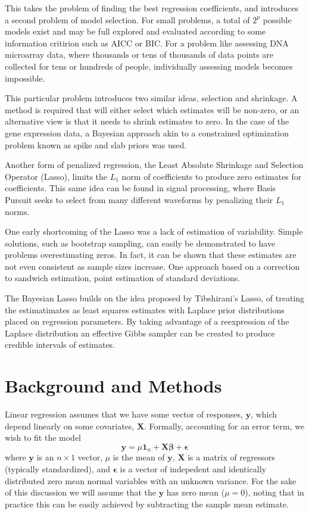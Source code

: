 \documentclass{uwstat572}
\begin{document}
This takes the problem of finding the best regression coefficients, and introduces a second problem of model selection. For small problems, a total of $2^p$ possible models exist and may be full explored and evaluated according to some information critirion such as AICC or BIC. For a problem like assessing DNA microarray data, where thousands or tens of thousands of data points are collected for tens or hundreds of people, individually assessing models becomes impossible.\cite{ishwaran2005spike}

This particular problem introduces two similar ideas, selection and shrinkage. A method is required that will either select which estimates will be non-zero, or an alternative view is that it needs to shrink estimates to zero. In the case of the gene expression data, a Bayesian approach akin to a constrained optimization problem known as spike and slab priors was used.\cite{ishwaran2005spike}

Another form of penalized regression, the Least Absolute Shrinkage and Selection Operator (Lasso), limits the $L_1$ norm of coefficients to produce zero estimates for coefficients. This same idea can be found in signal processing, where Basis Pursuit seeks to select from many different waveforms by penalizing their $L_1$ norms.\cite{chen2001atomic}

One early shortcoming of the Lasso was a lack of estimation of variability. Simple solutions, such as bootstrap sampling, can easily be demonstrated to have problems overestimating zeros.\cite{kyung2010penalized} In fact, it can be shown that these estimates are not even consistent as sample sizes increase.\cite{shao1996bootstrap} One approach based on a correction to sandwich estimation, point estimation of standard deviations.\cite{fan2001variable}

The Bayesian Lasso builds on the idea proposed by Tibshirani's Lasso, of treating the estimatimates as least squares estimates with Laplace prior distributions placed on regression parameters. By taking advantage of a reexpression of the Laplace distribution an effective Gibbs sampler can be created to produce credible intervals of estimates.\cite{tibshirani1996regression}

\section{Background and Methods}
Linear regression assumes that we have some vector of responses, $\boldsymbol{y}$, which depend linearly on some covariates, $\boldsymbol{X}$. Formally, accounting for an error term, we wish to fit the model \[
\boldsymbol{y} = \mu \boldsymbol{1}_n + \boldsymbol{X}\boldsymbol{\beta}+\boldsymbol{\epsilon}
\] where $\boldsymbol{y}$ is an $n \times 1$ vector, $\mu$ is the mean of $\boldsymbol{y}$, $\boldsymbol{X}$ is a matrix of regressors (typically standardized), and $\boldsymbol{\epsilon}$ is a vector of indepedent and identically distributed zero mean normal variables with an unknown variance. For the sake of this discussion we will assume that the $\boldsymbol{y}$ has zero mean ($\mu=0$), noting that in practice this can be easily achieved by subtracting the sample mean estimate.
\end{document}
